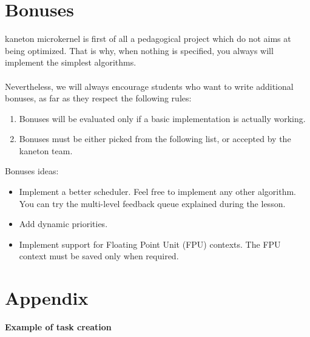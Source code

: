 %
%

\newpage

\section{Bonuses}

kaneton microkernel is first of all a pedagogical project which do not
aims at being optimized. That is why, when nothing is specified, you
always will implement the simplest algorithms.\\
\\
Nevertheless, we will always encourage students who want to write
additional bonuses, as far as they respect the following rules:

\begin{enumerate}
  \item Bonuses will be evaluated only if a basic implementation is
  actually working.
  \item Bonuses must be either picked from the following list, or
  accepted by the kaneton team.\\
\end{enumerate}

Bonuses ideas:
\begin{itemize}
\item
  Implement a better scheduler. Feel free to implement any other
  algorithm. You can try the multi-level feedback queue explained
  during the lesson.

\item
  Add dynamic priorities.

\item
  Implement support for Floating Point Unit (FPU) contexts. The FPU
  context must be saved only when required.
\end{itemize}

%
%

\newpage

\section{Appendix}

\textbf{Example of task creation}


